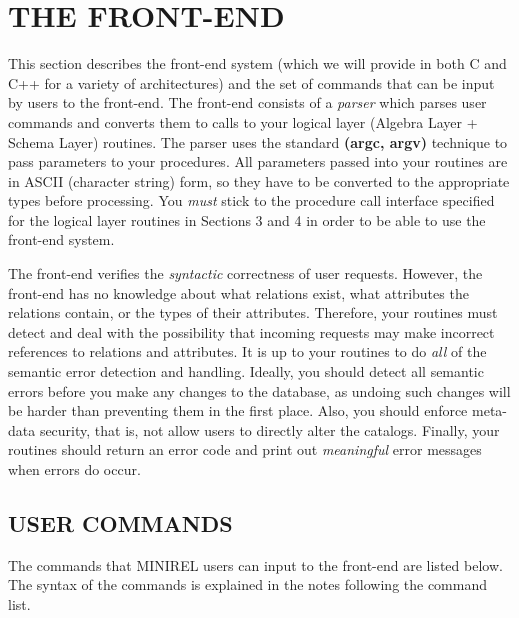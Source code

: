 
\section{THE FRONT-END}
This section describes the front-end system (which we will provide in
both C and C++ for a variety of architectures) and the set of commands
that can be input by users to the front-end.  The front-end consists of
a \emph{parser} which parses user commands and converts them to calls
to your logical layer (Algebra Layer + Schema Layer) routines.  The
parser uses the standard {\bf (argc, argv)\/} technique to pass
parameters to your procedures.  All parameters passed into your
routines are in ASCII (character string) form, so they have to be
converted to the appropriate types before processing.  You \emph{must}
stick to the procedure call interface specified for the logical layer
routines in Sections 3 and 4 in order to be able to use the front-end
system.

The front-end verifies the \emph{syntactic} correctness of user
requests.  However, the front-end has no knowledge about what relations
exist, what attributes the relations contain, or the types of their
attributes.  Therefore, your routines must detect and deal with the
possibility that incoming requests may make incorrect references to
relations and attributes.  It is up to your routines to do \emph{all}
of the semantic error detection and handling.  Ideally, you should
detect all semantic errors before you make any changes to the database,
as undoing such changes will be harder than preventing them in the
first place.  Also, you should enforce meta-data security, that is, not
allow users to directly alter the catalogs. Finally, your routines
should return an error code and print out \emph{meaningful} error
messages when errors do occur.

\subsection{USER COMMANDS}
The commands that MINIREL users can input to the front-end are listed
below.  The syntax of the commands is explained in the notes following
the command list.


